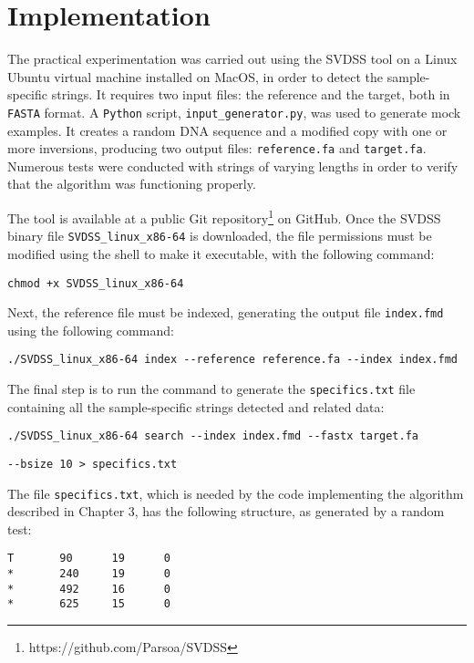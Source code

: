 \section{Implementation}
The practical experimentation was carried out using the SVDSS \cite{denti_svdss_2023} tool on a Linux Ubuntu virtual machine installed on MacOS, in order to detect the sample-specific strings. It requires two input files: the reference and the target, both in \texttt{FASTA} format. A \texttt{Python} script, \texttt{input\_generator.py}, was used to generate mock examples. It creates a random DNA sequence and a modified copy with one or more inversions, producing two output files: \texttt{reference.fa} and \texttt{target.fa}. Numerous tests were conducted with strings of varying lengths in order to verify that the algorithm was functioning properly.

The tool is available at a public Git repository\footnote{https://github.com/Parsoa/SVDSS} on GitHub. Once the SVDSS binary file \texttt{SVDSS\_linux\_x86-64} is downloaded, the file permissions must be modified using the shell to make it executable, with the following command: 

\begin{verbatim}
chmod +x SVDSS_linux_x86-64
\end{verbatim}

Next, the reference file must be indexed, generating the output file \texttt{index.fmd} using the following command: 

\begin{verbatim}
./SVDSS_linux_x86-64 index --reference reference.fa --index index.fmd
\end{verbatim}

The final step is to run the command to generate the \texttt{specifics.txt} file containing all the sample-specific strings detected and related data: 

\begin{verbatim}
./SVDSS_linux_x86-64 search --index index.fmd --fastx target.fa  
\end{verbatim}

\begin{verbatim}
--bsize 10 > specifics.txt
\end{verbatim}

The file \texttt{specifics.txt}, which is needed by the code implementing the algorithm described in Chapter 3, has the following structure, as generated by a random test:

\begin{verbatim}
T       90      19      0
*       240     19      0
*       492     16      0
*       625     15      0
\end{verbatim}

